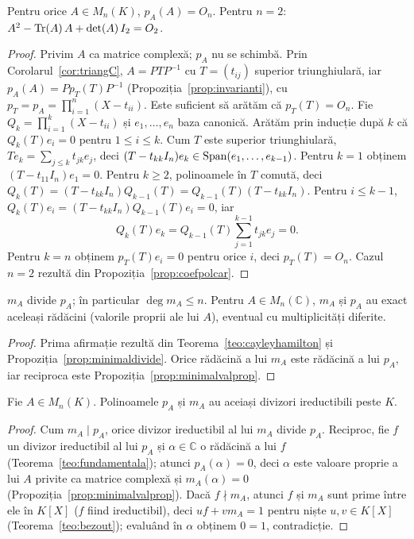 \begin{teorema}\label{teo:cayleyhamilton}
Pentru orice $A\in M_n(K)$, $p_A(A)=O_n$. Pentru $n=2$: $A^2-\operatorname{Tr}(A)\,A+\det(A)\,I_2=O_2$.
\end{teorema}

\begin{proof}
Privim $A$ ca matrice complexă; $p_A$ nu se schimbă. Prin Corolarul~\ref{cor:triangC}, $A=PTP^{-1}$ cu $T=(t_{ij})$ superior triunghiulară, iar $p_A(A)=Pp_T(T)P^{-1}$ (Propoziția~\ref{prop:invarianti}), cu $p_T=p_A=\prod_{i=1}^n(X-t_{ii})$. Este suficient să arătăm că $p_T(T)=O_n$. Fie $Q_k=\prod_{i=1}^k(X-t_{ii})$ și $e_1,\dots,e_n$ baza canonică. Arătăm prin inducție după $k$ că $Q_k(T)e_i=0$ pentru $1\le i\le k$. Cum $T$ este superior triunghiulară, $Te_k=\sum_{j\le k}t_{jk}e_j$, deci $(T-t_{kk}I_n)e_k\in\operatorname{Span}(e_1,\dots,e_{k-1})$. Pentru $k=1$ obținem $(T-t_{11}I_n)e_1=0$. Pentru $k\ge2$, polinoamele în $T$ comută, deci $Q_k(T)=(T-t_{kk}I_n)Q_{k-1}(T)=Q_{k-1}(T)(T-t_{kk}I_n)$. Pentru $i\le k-1$, $Q_k(T)e_i=(T-t_{kk}I_n)Q_{k-1}(T)e_i=0$, iar
\[
Q_k(T)e_k=Q_{k-1}(T)\sum_{j=1}^{k-1}t_{jk}e_j=0 .
\]
Pentru $k=n$ obținem $p_T(T)e_i=0$ pentru orice $i$, deci $p_T(T)=O_n$. Cazul $n=2$ rezultă din Propoziția~\ref{prop:coefpolcar}.
\end{proof}

\begin{corolar}\label{cor:mdividep}
$m_A$ divide $p_A$; în particular $\deg m_A\le n$. Pentru $A\in M_n(\mathbb{C})$, $m_A$ și $p_A$ au exact aceleași rădăcini (valorile proprii ale lui $A$), eventual cu multiplicități diferite.
\end{corolar}

\begin{proof}
Prima afirmație rezultă din Teorema~\ref{teo:cayleyhamilton} și Propoziția~\ref{prop:minimaldivide}. Orice rădăcină a lui $m_A$ este rădăcină a lui $p_A$, iar reciproca este Propoziția~\ref{prop:minimalvalprop}.
\end{proof}

\begin{teorema}[Frobenius]\label{teo:frobeniusminimal}
Fie $A\in M_n(K)$. Polinoamele $p_A$ și $m_A$ au aceiași divizori ireductibili peste $K$.
\end{teorema}

\begin{proof}
Cum $m_A\mid p_A$, orice divizor ireductibil al lui $m_A$ divide $p_A$. Reciproc, fie $f$ un divizor ireductibil al lui $p_A$ și $\alpha\in\mathbb{C}$ o rădăcină a lui $f$ (Teorema~\ref{teo:fundamentala}); atunci $p_A(\alpha)=0$, deci $\alpha$ este valoare proprie a lui $A$ privite ca matrice complexă și $m_A(\alpha)=0$ (Propoziția~\ref{prop:minimalvalprop}). Dacă $f\nmid m_A$, atunci $f$ și $m_A$ sunt prime între ele în $K[X]$ ($f$ fiind ireductibil), deci $uf+vm_A=1$ pentru niște $u,v\in K[X]$ (Teorema~\ref{teo:bezout}); evaluând în $\alpha$ obținem $0=1$, contradicție.
\end{proof}

